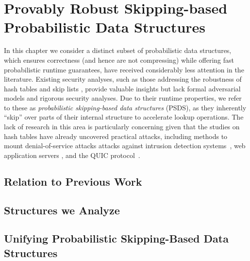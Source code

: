 \chapter{Provably Robust Skipping-based Probabilistic Data Structures}

In this chapter we consider a distinct subset of probabilistic data structures, which ensures correctness (and hence are not compressing) while offering fast probabilistic runtime guarantees, have received considerably less attention in the literature. Existing security analyses, such as those addressing the robustness of hash tables \cite{CrosbyW03, aumasson2012hash, bar2007remote, eckhoff2009hash,klink2011efficient,bottinelli2025hash} and skip lists \cite{nussbaum2019skiplist}, provide valuable insights but lack formal adversarial models and rigorous security analyses. Due to their runtime properties, we refer to these as \emph {probabilistic skipping-based data structures} (PSDS), as they inherently ``skip'' over parts of their internal structure to accelerate lookup operations.
The lack of research in this area is particularly concerning given that the studies on hash tables have already uncovered practical attacks, including methods to mount denial-of-service attacks attacks against intrusion detection systems~\cite{bar2007remote}, web application servers \cite{klink2011efficient}, and the QUIC protocol~\cite{bottinelli2025hash}.


\section{Relation to Previous Work}


\section{Structures we Analyze}


\section{Unifying Probabilistic Skipping-Based Data Structures}


